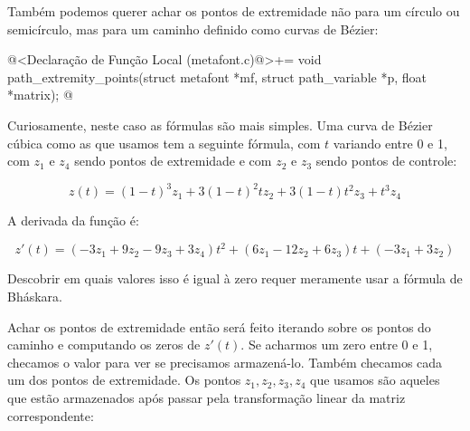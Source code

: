 {{{{{{Também podemos querer achar os pontos de extremidade não para um
círculo ou semicírculo, mas para um caminho definido como curvas de
Bézier:

\iniciocodigo
@<Declaração de Função Local (metafont.c)@>+=
void path_extremity_points(struct metafont *mf, struct path_variable *p,
                           float *matrix);
@
\fimcodigo

Curiosamente, neste caso as fórmulas são mais simples. Uma curva de
Bézier cúbica como as que usamos tem a seguinte fórmula, com $t$
variando entre 0 e 1, com $z_1$ e $z_4$ sendo pontos de extremidade e
com  $z_2$ e $z_3$ sendo pontos de controle:

$$
z(t) = (1-t)^3z_1+3(1-t)^2tz_2+3(1-t)t^2z_3+t^3z_4
$$

A derivada da função é:

$$
z'(t) = (-3z_1+9z_2-9z_3+3z_4)t^2+(6z_1-12z_2+6z_3)t+(-3z_1+3z_2)
$$

Descobrir em quais valores isso é igual à zero requer meramente usar a
fórmula de Bháskara.

Achar os pontos de extremidade então será feito iterando sobre os
pontos do caminho e computando os zeros de $z'(t)$. Se acharmos um
zero entre 0 e 1, checamos o valor para ver se precisamos
armazená-lo. Também checamos cada um dos pontos de extremidade. Os
pontos $z_1, z_2, z_3, z_4$ que usamos são aqueles que estão
armazenados após passar pela transformação linear da matriz
correspondente:

}}}}}}

